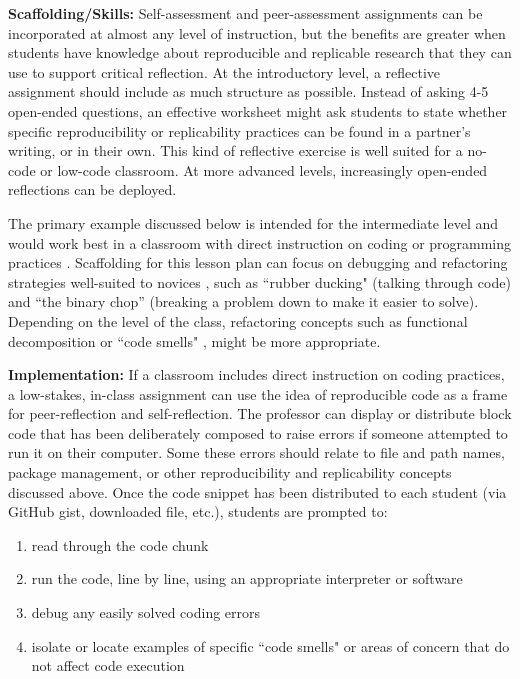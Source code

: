 \documentclass[
  12pt]{article}
\begin{document}
\textbf{Scaffolding/Skills:} Self-assessment and peer-assessment assignments can be incorporated at almost any level of instruction, but the benefits are greater when students have knowledge about reproducible and replicable research that they can use to support critical reflection. 
At the introductory level, a reflective assignment should include as much structure as possible.
Instead of asking 4-5 open-ended questions, an effective worksheet might ask students to state whether specific reproducibility or replicability practices can be found in a partner's writing, or in their own. 
This kind of reflective exercise is well suited for a no-code or low-code classroom. 
At more advanced levels, increasingly open-ended reflections can be deployed. 

The primary example discussed below is intended for the intermediate level and would work best in a classroom with direct instruction on coding or programming practices \citep{pruim:2023}. 
Scaffolding for this lesson plan can focus on debugging and refactoring strategies well-suited to novices \citep{McConnel:Code_Complete}, such as ``rubber ducking" (talking through code) and ``the binary chop'' (breaking a problem down to make it easier to solve). 
Depending on the level of the class, refactoring concepts such as functional decomposition or ``code smells" \citep{Bryan:2018}, might be more appropriate.

\textbf{Implementation:}
If a classroom includes direct instruction on coding practices, a low-stakes, in-class assignment can use the idea of reproducible code as a frame for peer-reflection and self-reflection. 
The professor can display or distribute block code that has been deliberately composed to raise errors if someone attempted to run it on their computer. 
Some these errors should relate to file and path names, package management, or other reproducibility and replicability concepts discussed above. 
Once the code snippet has been distributed to each student (via GitHub gist, downloaded file, etc.), students are prompted to: 

\begin{enumerate}
  \item read through the code chunk
  \item run the code, line by line, using an appropriate interpreter or software
  \item debug any easily solved coding errors 
  \item isolate or locate examples of specific ``code smells" or areas of concern that do not affect code execution 
\end{enumerate}
\end{document}
